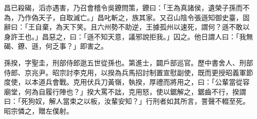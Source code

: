 \begin{pinyinscope}
 昌已殺碣，滔亦遇害，乃召會稽令吳鐐問策，鐐曰：「王為真諸侯，遺榮子孫而不為，乃作偽天子，自取滅亡。」昌叱斬之，族其家。又召山陰令張遜知御史臺，固辭曰：「王自棄，為天下笑。且六州勢不助逆，王據孤州以速死，謂何？遜不敢以身許王也。」昌惡之，曰：「遜不知天意，議邪說拒我。」囚之。他日謂人曰：「我無碣、鐐、遜，何乏事？」即害之。



 孫揆，字聖圭，刑部侍郎逖五世從孫也。第進士，闢戶部巡官。歷中書舍人、刑部侍郎、京兆尹。昭宗討李克用，以揆為兵馬招討制置宣慰副使，既而更授昭義軍節度使，以本道兵會戰。克用伏兵刀黃嶺，執揆，厚禮而將用之，曰：「公輩當從容廟堂，何為自履行陣也？」揆大罵不詘，克用怒，使以鋸解之，鋸齒不行，揆謂曰：「死狗奴，解人當束之以板，汝輩安知？」行刑者如其所言，詈聲不輟至死。昭宗憐之，贈左僕射。



\end{pinyinscope}